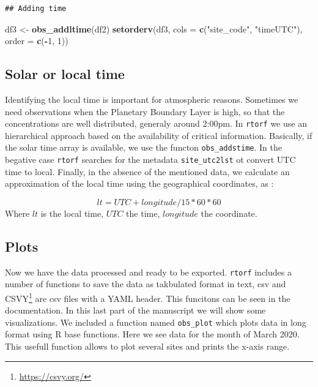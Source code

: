 \documentclass[10pt,a4paper,onecolumn]{article}
\newenvironment{Shaded}{\begin{snugshade}}{\end{snugshade}}
\newcommand{\AttributeTok}[1]{\textcolor[rgb]{0.13,0.29,0.53}{#1}}
\newcommand{\DecValTok}[1]{\textcolor[rgb]{0.00,0.00,0.81}{#1}}
\newcommand{\FunctionTok}[1]{\textcolor[rgb]{0.13,0.29,0.53}{\textbf{#1}}}
\newcommand{\NormalTok}[1]{#1}
\newcommand{\OtherTok}[1]{\textcolor[rgb]{0.56,0.35,0.01}{#1}}
\newcommand{\SpecialCharTok}[1]{\textcolor[rgb]{0.81,0.36,0.00}{\textbf{#1}}}
\newcommand{\StringTok}[1]{\textcolor[rgb]{0.31,0.60,0.02}{#1}}
\begin{document}
\begin{verbatim}
## Adding time
\end{verbatim}

\begin{Shaded}
\begin{Highlighting}[]
\NormalTok{df3 }\OtherTok{\textless{}{-}} \FunctionTok{obs\_addltime}\NormalTok{(df2)}
\FunctionTok{setorderv}\NormalTok{(df3, }\AttributeTok{cols =} \FunctionTok{c}\NormalTok{(}\StringTok{"site\_code"}\NormalTok{, }\StringTok{"timeUTC"}\NormalTok{),}
          \AttributeTok{order =} \FunctionTok{c}\NormalTok{(}\SpecialCharTok{{-}}\DecValTok{1}\NormalTok{, }\DecValTok{1}\NormalTok{))}
\end{Highlighting}
\end{Shaded}

\subsection{Solar or local time}\label{solar-or-local-time}

Identifying the local time is important for atmospheric reasons.
Sometimes we need observations when the Planetary Boundary Layer is
high, so that the concentrations are well distributed, generaly around
2:00pm. In \texttt{rtorf} we use an hierarchical approach based on the
availability of critical information. Basically, if the solar time array
is available, we use the functon \texttt{obs\_addstime}. In the begative
case \texttt{rtorf} searches for the metadata \texttt{site\_utc2lst} ot
convert UTC time to local. Finally, in the absence of the mentioned
data, we calculate an approximation of the local time using the
geographical coordinates, as :

\[
lt = UTC + longitude/15 * 60 * 60
\] Where \(lt\) is the local time, \(UTC\) the time, \(longitude\) the
coordinate.

\subsection{Plots}\label{plots}

Now we have the data processed and ready to be exported. \texttt{rtorf}
includes a number of functions to save the data as takbulated format in
text, csv and CSVY\footnote{\url{https://csvy.org/}} are csv files with
a YAML header. This funcitons can be seen in the documentation. In this
last part of the manuscript we will show some visualizations. We
included a function named \texttt{obs\_plot} which plots data in long
format using R base functions. Here we see data for the month of March
2020. This usefull function allows to plot several sites and prints the
x-axis range.
\end{document}
